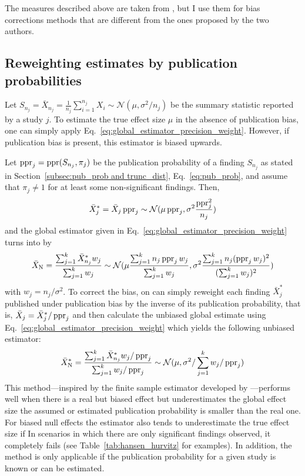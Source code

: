 The measures described above are taken from \citet{andrews_identification_2017}, but I use them for bias corrections methods that are different from the ones proposed by the two authors.%

\subsection{Reweighting estimates by publication probabilities}
Let ${S_{n_j} = \bar{X}_{n_j} = \frac{1}{n_j} \sum_{i=1}^{n_j} X_i \sim \mathcal{N}(\mu, \sigma^2/n_j)}$ be the summary statistic reported by a study $j$. To estimate the true effect size $\mu$ in the absence of publication bias, one can simply apply Eq.~\ref{eq:global_estimator_precision_weight}. However, if publication bias is present, this estimator is biased upwards.\par 
Let ${\operatorname{\text{ppr}}_j = \operatorname{\text{ppr}}(S_{n_j},\pi_j)}$ be the publication probability of a finding $S_{n_j}$ as stated in Section~\ref{subsec:pub_prob and trunc_dist}, Eq.~\ref{eq:pub_prob}, and assume that $\pi_j \neq 1$ for at least some non-significant findings. Then, $${\bar{X}_j^{*} = \bar{X}_j \operatorname{\text{ppr}}_j \sim \mathcal{N}(\mu\operatorname{\text{ppr}}_j, \sigma^2\frac{\operatorname{\text{ppr}}_j^2}{n_j}})$$ and the global estimator given in Eq.~\ref{eq:global_estimator_precision_weight} turns into by
\begin{align}
    \bar{X}_\text{N} = \frac{\sum_{j=1}^k \bar{X}_{n_j}^{*}w_j}{\sum_{j=1}^k w_j}\sim \mathcal{N}(\mu \frac{\sum_{j=1}^k n_j\operatorname{\text{ppr}}_j w_j}{\sum_{j=1}^k w_j},\sigma^2\frac{\sum_{j=1}^k n_j(\operatorname{\text{ppr}}_j w_j)^2}{(\sum_{j=1}^k w_j)^2})
\end{align} 
with ${w_j = n_j/\sigma^2}$. To correct the bias, on can simply reweight each finding $\bar{X}_j^{*}$ published under publication bias by the inverse of its publication probability, that is, $\bar{X}_j = \bar{X}_j^{*}/\operatorname{\text{ppr}}_j$ and then calculate the unbiased global estimate using Eq.~\ref{eq:global_estimator_precision_weight} which yields the following unbiased estimator:
\begin{align}
    \bar{X}_\text{N}^{*} = \frac{\sum_{j=1}^k \bar{X}_{n_j}^{*}w_j/\operatorname{\text{ppr}}_j}{\sum_{j=1}^k w_j/\operatorname{\text{ppr}}_j}\sim \mathcal{N}(\mu,\sigma^2/\sum_{j=1}^k w_j/\operatorname{\text{ppr}}_j) \label{eq:global_estimator_corrected}
\end{align} 
This method---inspired by the finite sample estimator developed by \citet{hansen_theory_1943}---performs well when there is a real but biased effect but underestimates the global effect size the assumed or estimated publication probability is smaller than the real one. For biased null effects the estimator also tends to underestimate the true effect size if In scenarios in which there are only significant findings observed, it completely fails (see Table~\ref{tab:hansen_hurvitz} for examples). In addition, the method is only applicable if the publication probability for a given study is known or can be estimated.\par
